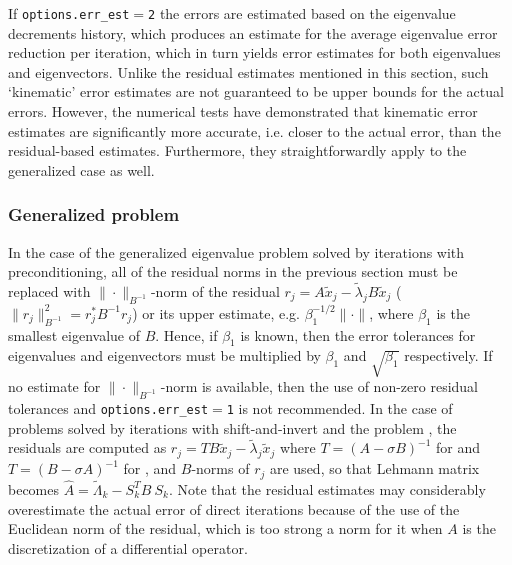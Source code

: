 If {\tt options.err\_est$=$2}
the errors are estimated
based on the eigenvalue decrements history,
which produces an estimate for the average 
eigenvalue error reduction per iteration,
which in turn yields error estimates
for both eigenvalues and eigenvectors.
Unlike the residual estimates mentioned in this section, 
such `kinematic' error estimates are
not guaranteed to be upper bounds for the actual errors.
However, the numerical tests have demonstrated
that kinematic error estimates 
are significantly more accurate,
i.e. closer to the actual error,
than the residual-based estimates. 
Furthermore, they straightforwardly
apply to the generalized case as well.

\subsubsection{Generalized problem}

In the case
of the generalized eigenvalue problem 
solved by iterations with preconditioning,
all of the residual norms in the previous section must be replaced
with %
$\|\cdot\|_{B^{-1}}$-norm of the residual
$r_j = A \tilde x_j - \tilde\lambda_j B \tilde x_j$
($\|r_j\|_{B^{-1}}^2 = r_j^* B^{-1} r_j$)
or its upper estimate, e.g. 
$\beta_1^{-1/2}\|\cdot\|$,
where $\beta_1$ is the smallest eigenvalue of $B$.
Hence, if $\beta_1$ is known, then
the error tolerances for eigenvalues and eigenvectors
must be multiplied by $\beta_1$ and $\sqrt{\beta_1}$
respectively. If no estimate for $\|\cdot\|_{B^{-1}}$-norm
is available, then the use of
non-zero residual tolerances and
{\tt options.err\_est$=$1}
is not recommended.
In the case of problems  solved by 
iterations with shift-and-invert
and the problem ,
the residuals are computed as
$r_j = T B \tilde x_j - \tilde \lambda_j \tilde x_j$
where
$T = (A - \sigma B)^{-1}$ for  and
$T = (B - \sigma A)^{-1}$ for ,
and $B$-norms of $r_j$ are used, so that
Lehmann matrix becomes
$\hat A = \tilde\Lambda_k - S_k^T B\ S_k$.
Note that the residual estimates 
may considerably overestimate the actual error of direct iterations
because  of the use of the Euclidean norm of the residual,
which is too strong a norm for it
when $A$ is the discretization of a differential operator.
\fi


